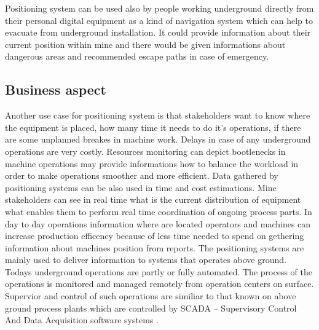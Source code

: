 \documentclass[../main.tex]{subfiles}
\begin{document}
Positioning system can be used also by people working underground directly from their personal digital equipment\cite{Thesis_CM} as a kind of navigation system which can help to evacuate from underground installation. It could provide information about their current position within mine and there would be given informations about dangerous areas and recommended escape paths in case of emergency.

\subsection{Business aspect} %
\label{sub:business_aspect}

Another use case for positioning system is that stakeholders want to know where the equipment is placed, how many time it needs to do it's operations, if there are some unplanned breakes in machine work. Delays in case of any underground operations are very costly. Resources monitoring can depict bootlenecks in machine operations may provide informations how to balance the workload in order to make operations smoother and more efficient. Data gathered by positioning systems can be also used in time and cost estimations. Mine stakeholders can see in real time what is the current distribution of equipment what enables them to perform real time coordination of ongoing process parts. In day to day operations information where are located operators and machines can increase production efficency because of less time needed to spend on gethering information about machines position from reports. \cite{thesis_tablet_positioning} The positioning systems are mainly used to deliver information to systems that operates above ground. Todays underground operations are partly or fully automated. The process of the operations is monitored and managed remotely from operation centers on surface. Supervior and control of such operations are similiar to that known on above ground process plants which are controlled by SCADA -- Supervisory Control And Data Acquisition software systems \cite{Thesis_CM}.
\end{document}
